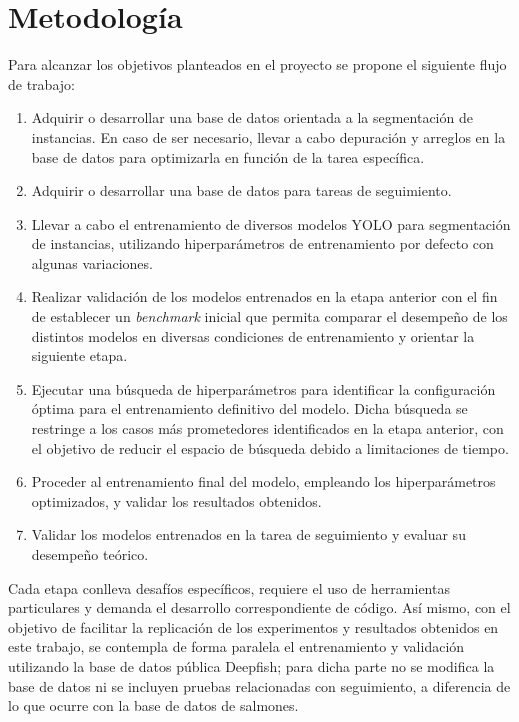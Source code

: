 \section{Metodología}
Para alcanzar los objetivos planteados en el proyecto se propone el siguiente flujo de trabajo:

\begin{enumerate}
    \item Adquirir o desarrollar una base de datos orientada a la segmentación de instancias. En caso de ser necesario, llevar a cabo depuración y arreglos en la base de datos para optimizarla en función de la tarea específica.
    \item Adquirir o desarrollar una base de datos para tareas de seguimiento.
    \item Llevar a cabo el entrenamiento de diversos modelos YOLO para segmentación de instancias, utilizando hiperparámetros de entrenamiento por defecto con algunas variaciones.
    \item Realizar validación de los modelos entrenados en la etapa anterior con el fin de establecer un \textit{benchmark} inicial que permita comparar el desempeño de los distintos modelos en diversas condiciones de entrenamiento y orientar la siguiente etapa.
    \item Ejecutar una búsqueda de hiperparámetros para identificar la configuración óptima para el entrenamiento definitivo del modelo. Dicha búsqueda se restringe a los casos más prometedores identificados en la etapa anterior, con el objetivo de reducir el espacio de búsqueda debido a limitaciones de tiempo.
    \item Proceder al entrenamiento final del modelo, empleando los hiperparámetros optimizados, y validar los resultados obtenidos.
    \item Validar los modelos entrenados en la tarea de seguimiento y evaluar su desempeño teórico.
\end{enumerate}

Cada etapa conlleva desafíos específicos, requiere el uso de herramientas particulares y demanda el desarrollo correspondiente de código. Así mismo, con el objetivo de facilitar la replicación de los experimentos y resultados obtenidos en este trabajo, se contempla de forma paralela el entrenamiento y validación utilizando la base de datos pública Deepfish; para dicha parte no se modifica la base de datos ni se incluyen pruebas relacionadas con seguimiento, a diferencia de lo que ocurre con la base de datos de salmones.